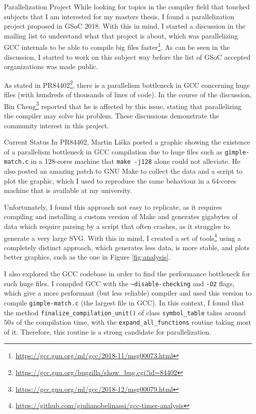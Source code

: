 \documentclass[12pt]{article}
\begin{document}
\begin{section}{Parallelization Project}
While looking for topics in the compiler field that touched subjects that I
am interested for my masters thesis, I found a
parallelization project proposed in GSoC 2018. With this in mind, I started a
discussion in the mailing list to understand what that project is about,
which was parallelizing GCC internals to be able to compile big files
faster\footnote{\url{https://gcc.gnu.org/ml/gcc/2018-11/msg00073.html}}.
As can be seen in the discussion, I started to work on this subject way before
the list of GSoC accepted organizations was made public.

As stated in PR84402\footnote{\url{https://gcc.gnu.org/bugzilla/show\_bug.cgi?id=84402}},
there is a parallelism bottleneck in GCC concerning huge files (with hundreds of
thousands of lines of code). In the course of the discussion,
Bin Cheng\footnote{\url{https://gcc.gnu.org/ml/gcc/2018-12/msg00079.html}}
reported that
he is affected by this issue, stating that parallelizing the
compiler may solve his problem. These discussions demonstrate the
community interest in this project.

\begin{subsection}{Current Status}
In PR84402, Martin Liška posted a graphic showing the existence of a
parallelism bottleneck in GCC compilation due to huge files such as
\texttt{gimple-match.c} in a 128-cores machine that \texttt{make -j128} alone could not alleviate. He also posted an amazing patch to
GNU Make to collect the data and a script to plot the graphic, which I used
to reproduce the same behaviour in a 64-cores machine that is available at
my university.

Unfortunately, I found this approach not easy to replicate, as
it requires compiling and installing a custom version of Make and generates
gigabytes of data which require parsing by a script that often crashes, as
it struggles to generate a very large SVG. With this in mind, I created a set of
tools\footnote{\url{https://github.com/giulianobelinassi/gcc-timer-analysis}}
using a completely distinct approach, which generates less data, is more stable, and
plots better graphics, such as the one in Figure \ref{fig:analysis}.

I also explored the GCC codebase in order to find the performance bottleneck for
such huge files. I compiled GCC with the
\texttt{--disable-checking} and \texttt{-O2} flags, which
give a more performant (but less reliable) compiler and used this version to compile
\texttt{gimple-match.c} (the largest file in GCC). In this context, I found that the method
\texttt{finalize\_compilation\_unit()} of
class \texttt{symbol\_table} takes around $50s$ of the compilation time, with the
\texttt{expand\_all\_functions}
routine taking most of it. Therefore, this routine is a strong candidate for parallelization.


\end{subsection}
\end{section}
\end{document}
